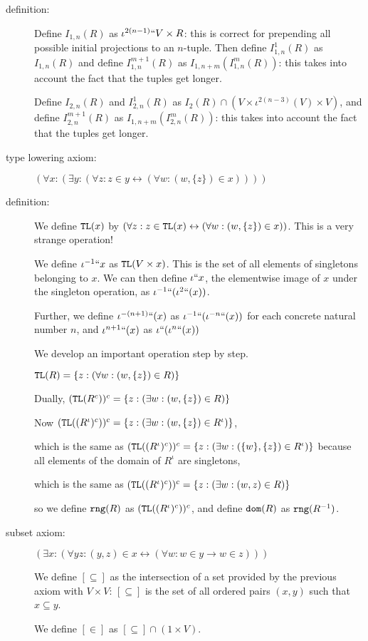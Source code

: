 \documentclass[112pt]{article}
\theoremstyle{definition}
\theoremstyle{remark}
\begin{document}
\begin{description}
\item[definition:]  Define $I_{1,n}(R)$ as $\iota^{2(n-1)}``V \times R$:  this is correct for prepending all possible initial projections
to an $n$-tuple.  Then define $I^1_{1,n}(R)$ as $I_{1,n}(R)$ and define $I^{m+1}_{1,n}(R)$ as $I_{1,n+m}(I^m_{1,n}(R))$:  this takes
into account the fact that the tuples get longer.

Define $I_{2,n}(R)$ and $I^1_{2,n}(R)$ as $I_2(R) \cap (V\times \iota^{2(n-3)}(V)\times V)$, and define $I^{m+1}_{2,n}(R)$ as $I_{1,n+m}(I^m_{2,n}(R))$:  this takes
into account the fact that the tuples get longer.

\item[type lowering axiom:]  $(\forall x:(\exists y:(\forall z:z \in y \leftrightarrow (\forall w:(w,\{z\}) \in x))))$

\item[definition:]
We define ${\tt TL}(x)$ by $(\forall z:z \in {\tt TL}(x) \leftrightarrow (\forall w:(w,\{z\}) \in x))$.  This is a very strange operation!

We define $\iota^{-1}``x$ as ${\tt TL}(V \times x)$.  This is the set of all elements of singletons
belonging to $x$.  We can then define $\iota``x$, the elementwise image of $x$ under the singleton operation, as $\iota^{-1}``(\iota^2``(x))$.

Further, we define $\iota^{-(n+1)}``(x)$ as $\iota^{-1}``(\iota^{-n}``(x))$ for each concrete natural number $n$, and $\iota^{n+1}``(x)$ as $\iota``(\iota^{n}``(x))$

We develop an important operation step by step.

${\tt TL}(R) = \{z:(\forall w:(w,\{z\})\in R)\}$

Dually, $({\tt TL}(R^c))^c = \{z:(\exists w:(w,\{z\})\in R)\}$

Now $({\tt TL}((R^\iota)^c))^c = \{z:(\exists w:(w,\{z\})\in R^\iota)\}$,

which is the same as $({\tt TL}((R^\iota)^c))^c = \{z:(\exists w:(\{w\},\{z\})\in R^\iota)\}$ because all elements
of the domain of $R^{\iota}$ are singletons,

which is the same as $({\tt TL}((R^\iota)^c))^c = \{z:(\exists w:(w,z)\in R)\}$

so we define ${\tt rng}(R)$ as $({\tt TL}((R^\iota)^c))^c$,
and define ${\tt dom}(R)$ as ${\tt rng}(R^{-1})$.

\item[subset axiom:]  $(\exists x:(\forall yz:(y,z) \in x \leftrightarrow (\forall w:w \in y \rightarrow w \in z)))$

We define $[\subseteq]$ as the intersection of a set provided by the previous axiom with $V \times V$:  $[\subseteq]$ is the set of all ordered pairs $(x,y)$ such that $x \subseteq y$.

We define $[\in]$ as $[\subseteq]\cap (1 \times V)$.



\end{description}
\end{document}
